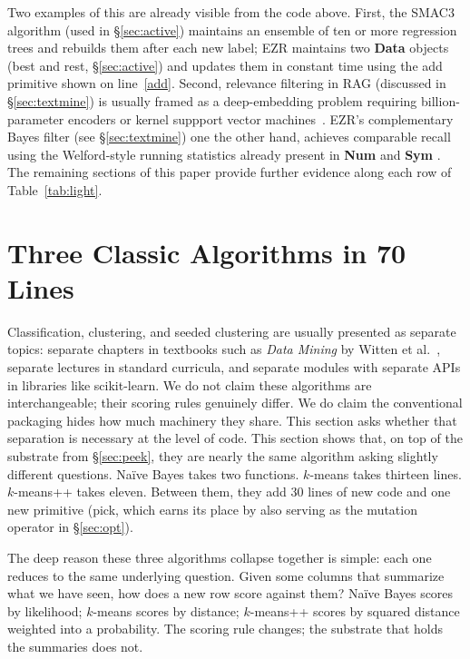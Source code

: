 \documentclass[AMA,STIX2COL]{WileyNJDv5}
\newcommand{\IT}{{\sffamily EZR}}
\newcommand{\cls}[1]{%
  \setlength{\fboxsep}{1.5pt}%
  \colorbox{clsbg}{\sffamily\bfseries{#1}}%
}
\begin{document}
Two examples of this are already visible from the code above. First,
the SMAC3~\cite{hutter2011sequential} algorithm (used in \S\ref{sec:active})
maintains an ensemble of ten
or more regression trees and rebuilds them after each new label;
\IT{} maintains two \cls{Data} objects (\textsf{best} and
\textsf{rest}, \S\ref{sec:active}) and updates them in constant
time using the \textsf{add} primitive shown on
line~\ref{add}. Second, relevance filtering in RAG (discussed in \S\ref{sec:textmine}) is usually
framed as a deep-embedding problem requiring billion-parameter
encoders or kernel suppport vector machines~\cite{Yu2018}. 
\IT{}'s complementary Bayes filter
(see \S\ref{sec:textmine}) one the other hand, achieves comparable recall using the
Welford-style running statistics already present in \cls{Num} and
\cls{Sym}. The remaining sections of this paper provide further
evidence along each row of Table~\ref{tab:light}.

\section{Three Classic Algorithms in 70 Lines}\label{sec:famous}

Classification, clustering, and seeded clustering are usually
presented as separate topics: separate chapters in textbooks such as
{\em Data Mining} by Witten et al.~\cite{Witten:2005}, separate
lectures in standard curricula, and separate modules with separate
APIs in libraries like scikit-learn. We do not claim these
algorithms are interchangeable; their scoring rules genuinely
differ. We do claim the conventional packaging hides how much
machinery they share. This section asks whether that separation
is necessary at the level of code.
 This section shows that, on top of the
substrate from \S\ref{sec:peek}, they are nearly the same
algorithm asking slightly different questions. Naïve Bayes takes two
functions. $k$-means takes thirteen lines. $k$-means++ takes
eleven. Between them, they add 30 lines of new code and one new
primitive (\textsf{pick}, which earns its place by also serving
as the mutation operator in \S\ref{sec:opt}).

The deep reason these three algorithms collapse together is
simple: each one reduces to the same underlying question. Given
some columns that summarize what we have seen, how does a new
row score against them? Naïve Bayes scores by likelihood;
$k$-means scores by distance; $k$-means++ scores by squared
distance weighted into a probability. The scoring rule changes;
the substrate that holds the summaries does not.
\end{document}

